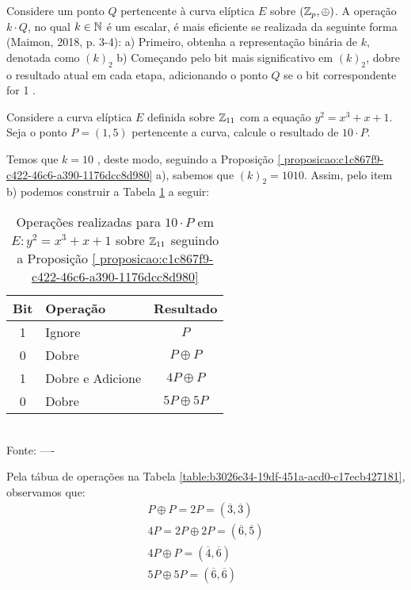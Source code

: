 \begin{proposicao} \label{ proposicao:c1c867f9-c422-46c6-a390-1176dcc8d980}
	Considere um ponto $Q$ pertencente à curva elíptica $E$ sobre $(\mathbb{Z}_p, \oplus)$. A operação $k \cdot Q$, no qual $k \in \mathbb{N}$ é um escalar, é mais eficiente se realizada da seguinte forma (Maimon, 2018, p. 3-4): a) Primeiro, obtenha a representação binária de $k$, denotada como $(k)_2$ b) Começando pelo bit mais significativo em $(k)_2$, dobre o resultado atual em cada etapa, adicionando o ponto $Q$ se o bit correspondente for 1 .
\end{proposicao}

\begin{exemplo} \label{exemplo:ce0d885d-c557-4f84-9ba0-f357318cf4c7}

	Considere a curva elíptica $E$ definida sobre $\mathbb{Z}_{11}$ com a equação $y^2 =
		x^3 + x + 1$. Seja o ponto $P = (1,5)$ pertencente a curva, calcule o resultado
	de $10 \cdot P$.

	Temos que $k = 10$ , deste modo, seguindo a Proposição \ref{
		proposicao:c1c867f9-c422-46c6-a390-1176dcc8d980} a), sabemos que $(k)_2 =
		1010$. Assim, pelo item b) podemos construir a Tabela
	\ref{table:54676bcf-30f6-4c1e-b2eb-a6897f37c606} a seguir:

	\begin{table}[h!]\centering
		\caption{Operações realizadas para $10 \cdot P$ em  $E: y^2 = x^3
				+ x + 1$  sobre $\mathbb{Z}_{11}$ seguindo a Proposição \ref{ proposicao:c1c867f9-c422-46c6-a390-1176dcc8d980}} \label{table:54676bcf-30f6-4c1e-b2eb-a6897f37c606}
		\begin{tabular}{|c|l|c|}
			\hline
			\textbf{Bit} & \textbf{Operação} & \textbf{Resultado} \\
			\hline
			1            & Ignore            & $P$                \\
			\hline
			0            & Dobre             & $ P \oplus P$      \\
			\hline
			1            & Dobre e Adicione  & $4P  \oplus P$     \\
			\hline
			0            & Dobre             & $5P  \oplus 5P$    \\
			\hline
		\end{tabular}
		\vspace*{0.4cm}\\ %
		Fonte:  ----
	\end{table}

	\justify
	Pela tábua de operações na Tabela \ref{table:b3026e34-19df-451a-acd0-c17ecb427181}, observamos que:
	\begin{align}
		P \oplus P = 2P = (\overline{3},\overline{3})   \nonumber    \\
		4 P = 2P \oplus  2P = (\overline{6},\overline{5})  \nonumber \\
		4 P \oplus P = (\overline{4},\overline{6})   \nonumber       \\
		5P \oplus5 P = (\overline{6},\overline{6})   \nonumber
	\end{align}


\end{exemplo}
